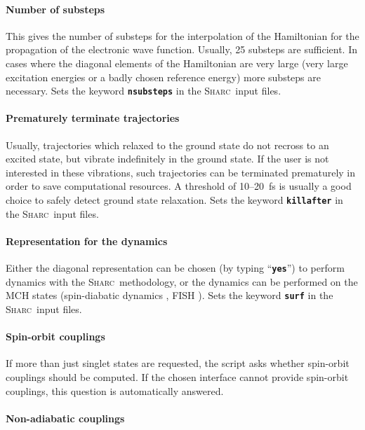 \documentclass[a4paper,10pt,DIV=15,openany]{scrbook}
\newcommand{\sharc}{\textsc{Sharc}}
\newcommand{\ttt}[1]{\textbf{\texttt{#1}}}
\begin{document}
\paragraph{Number of substeps}

This gives the number of substeps for the interpolation of the Hamiltonian for the propagation of the electronic wave function. Usually, 25 substeps are sufficient. In cases where the diagonal elements of the Hamiltonian are very large (very large excitation energies or a badly chosen reference energy) more substeps are necessary. Sets the keyword \ttt{nsubsteps} in the \sharc\ input files.

\paragraph{Prematurely terminate trajectories}

Usually, trajectories which relaxed to the ground state do not recross to an excited state, but vibrate indefinitely in the ground state. If the user is not interested in these vibrations, such trajectories can be terminated prematurely in order to save computational resources. A threshold of 10--20~fs is usually a good choice to safely detect ground state relaxation. Sets the keyword \ttt{killafter} in the \sharc\ input files.

\paragraph{Representation for the dynamics}

Either the diagonal representation can be chosen (by typing ``\ttt{yes}'') to perform dynamics with the \sharc\ methodology, or the dynamics can be performed on the MCH states (spin-diabatic dynamics \cite{Granucci2012JCP}, FISH \cite{Mitric2009PRA}). Sets the keyword \ttt{surf} in the \sharc\ input files.

\paragraph{Spin-orbit couplings}

If more than just singlet states are requested, the script asks whether spin-orbit couplings should be computed. If the chosen interface cannot provide spin-orbit couplings, this question is automatically answered.

\paragraph{Non-adiabatic couplings}
\end{document}
